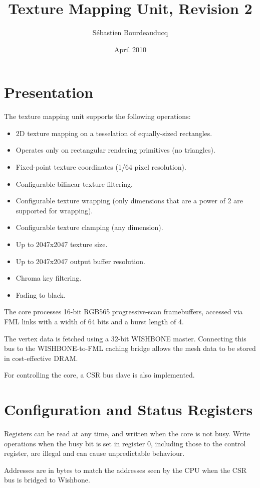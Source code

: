 \documentclass[a4paper,11pt]{article}
\title{Texture Mapping Unit, Revision 2}
\author{S\'ebastien Bourdeauducq}
\date{April 2010}
\begin{document}
\setlength{\parindent}{0pt}
\setlength{\parskip}{5pt}
\maketitle{}

\section{Presentation}
The texture mapping unit supports the following operations:
\begin{itemize}
\item 2D texture mapping on a tesselation of equally-sized rectangles.
\item Operates only on rectangular rendering primitives (no triangles).
\item Fixed-point texture coordinates (1/64 pixel resolution).
\item Configurable bilinear texture filtering.
\item Configurable texture wrapping (only dimensions that are a power of 2 are supported for wrapping).
\item Configurable texture clamping (any dimension).
\item Up to 2047x2047 texture size.
\item Up to 2047x2047 output buffer resolution.
\item Chroma key filtering.
\item Fading to black.
\end{itemize}

The core processes 16-bit RGB565 progressive-scan framebuffers, accessed via FML links with a width of 64 bits and a burst length of 4.

The vertex data is fetched using a 32-bit WISHBONE master. Connecting this bus to the WISHBONE-to-FML caching bridge allows the mesh data to be stored in cost-effective DRAM.

For controlling the core, a CSR bus slave is also implemented.

\section{Configuration and Status Registers}
Registers can be read at any time, and written when the core is not busy. Write operations when the busy bit is set in register 0, including those to the control register, are illegal and can cause unpredictable behaviour.

Addresses are in bytes to match the addresses seen by the CPU when the CSR bus is bridged to Wishbone.
\end{document}
